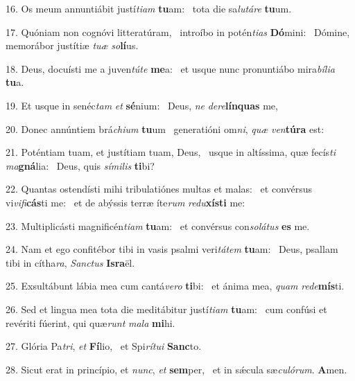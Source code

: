 16. Os meum annuntiábit justí\textit{ti}\textit{am} \textbf{tu}am: \ast\  tota die sa\textit{lu}\textit{tá}\textit{re} \textbf{tu}um.\

17. Quóniam non cognóvi litteratúram, \dag\  introíbo in potén\textit{ti}\textit{as} \textbf{Dó}mini: \ast\  Dómine, memorábor justítiæ \textit{tu}\textit{æ} \textit{so}\textbf{lí}us.\

18. Deus, docuísti me a juven\textit{tú}\textit{te} \textbf{me}a: \ast\  et usque nunc pronuntiábo mira\textit{bí}\textit{li}\textit{a} \textbf{tu}a.\

19. Et usque in senéc\textit{tam} \textit{et} \textbf{sé}nium: \ast\  Deus, \textit{ne} \textit{de}\textit{re}\textbf{lín}\textbf{quas} me,\

20. Donec annúntiem brá\textit{chi}\textit{um} \textbf{tu}um \ast\  generatióni om\textit{ni}, \textit{quæ} \textit{ven}\textbf{tú}\textbf{ra} est:\

21. Poténtiam tuam, et justítiam tuam, Deus, \dag\  usque in altíssima, quæ fecís\textit{ti} \textit{ma}\textbf{gná}lia: \ast\  Deus, quis \textit{sí}\textit{mi}\textit{lis} \textbf{ti}bi?\

22. Quantas ostendísti mihi tribulatiónes multas et malas: \dag\  et convérsus vi\textit{vi}\textit{fi}\textbf{cás}ti me: \ast\  et de abýssis terræ íte\textit{rum} \textit{re}\textit{du}\textbf{xís}\textbf{ti} me:\

23. Multiplicásti magnificén\textit{ti}\textit{am} \textbf{tu}am: \ast\  et convérsus con\textit{so}\textit{lá}\textit{tus} \textbf{es} me.\

24. Nam et ego confitébor tibi in vasis psalmi veri\textit{tá}\textit{tem} \textbf{tu}am: \ast\  Deus, psallam tibi in cítha\textit{ra}, \textit{Sanc}\textit{tus} \textbf{Is}\textbf{ra}ël.\

25. Exsultábunt lábia mea cum cantá\textit{ve}\textit{ro} \textbf{ti}bi: \ast\  et ánima mea, \textit{quam} \textit{red}\textit{e}\textbf{mís}ti.\

26. Sed et lingua mea tota die meditábitur justí\textit{ti}\textit{am} \textbf{tu}am: \ast\  cum confúsi et revériti fúerint, qui quæ\textit{runt} \textit{ma}\textit{la} \textbf{mi}hi.\

27. Glória Pa\textit{tri}, \textit{et} \textbf{Fí}lio, \ast\  et Spi\textit{rí}\textit{tu}\textit{i} \textbf{Sanc}to.\

28. Sicut erat in princípio, et \textit{nunc}, \textit{et} \textbf{sem}per, \ast\  et in sǽcula sæ\textit{cu}\textit{ló}\textit{rum}. \textbf{A}men.\

